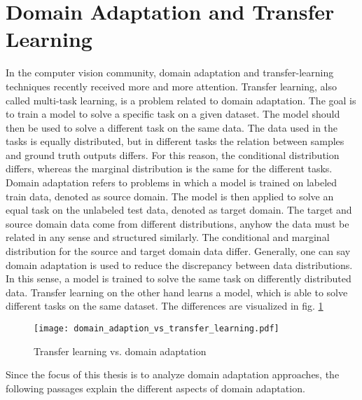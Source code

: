 \section{Domain Adaptation and Transfer Learning}

In the computer vision community, domain adaptation and transfer-learning techniques recently received more and more attention. Transfer learning, also called multi-task learning, is a problem related to domain adaptation. The goal is to train a model to solve a specific task on a given dataset. The model should then be used to solve a different task on the same data. The data used in the tasks is equally distributed, but in different tasks the relation between samples and ground truth outputs differs. For this reason, the conditional distribution differs, whereas the marginal distribution is the same for the different tasks. Domain adaptation refers to problems in which a model is trained on labeled train data, denoted as source domain. The model is then applied to solve an equal task on the unlabeled test data, denoted as target domain. The target and source domain data come from different distributions, anyhow the data must be related in any sense and structured similarly. The conditional and marginal distribution for the source and target domain data differ. Generally, one can say domain adaptation is used to reduce the discrepancy between data distributions. In this sense, a model is trained to solve the same task on differently distributed data. Transfer learning on the other hand learns a model, which is able to solve different tasks on the same dataset. The differences are visualized in fig. \ref{fig:domain_adaption_vs_transfer_learning}

\begin{figure}[H]
  \centering
  \texttt{[image: domain\_adaption\_vs\_transfer\_learning.pdf]}
  \caption {Transfer learning vs. domain adaptation} \label{fig:domain_adaption_vs_transfer_learning}
\end{figure}


Since the focus of this thesis is to analyze domain adaptation approaches, the following passages explain the different aspects of domain adaptation.
